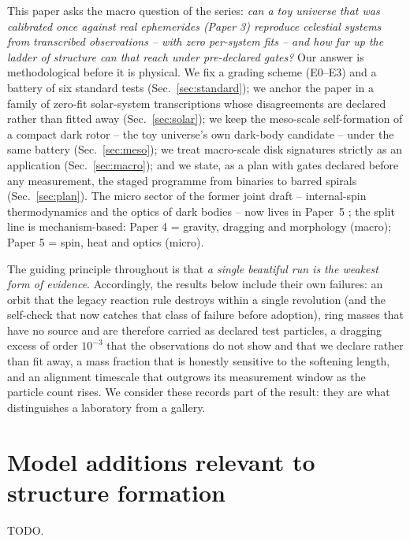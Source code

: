 \documentclass[aps,reprint,amsmath,amssymb,nofootinbib,superscriptaddress,floatfix]{revtex4-2}
\begin{document}
This paper asks the macro question of the series: \emph{can a toy
universe that was calibrated once against real ephemerides (Paper 3)
reproduce celestial systems from transcribed observations -- with zero
per-system fits -- and how far up the ladder of structure can that reach
under pre-declared gates?} Our answer is methodological before it is
physical. We fix a grading scheme (E0--E3) and a battery of six standard
tests (Sec.~\ref{sec:standard}); we anchor the paper in a family of
zero-fit solar-system transcriptions whose disagreements are declared
rather than fitted away (Sec.~\ref{sec:solar}); we keep the meso-scale
self-formation of a compact dark rotor -- the toy universe's own
dark-body candidate -- under the same battery (Sec.~\ref{sec:meso}); we
treat macro-scale disk signatures strictly as an application
(Sec.~\ref{sec:macro}); and we state, as a plan with gates declared
before any measurement, the staged programme from binaries to barred
spirals (Sec.~\ref{sec:plan}). The micro sector of the former joint
draft -- internal-spin thermodynamics and the optics of dark bodies --
now lives in Paper~5 \cite{paper5}; the split line is mechanism-based:
Paper 4 = gravity, dragging and morphology (macro); Paper 5 = spin, heat
and optics (micro).

The guiding principle throughout is that \emph{a single beautiful run is
the weakest form of evidence}. Accordingly, the results below include
their own failures: an orbit that the legacy reaction rule destroys
within a single revolution (and the self-check that now catches that
class of failure before adoption), ring masses that have no source and
are therefore carried as declared test particles, a dragging excess of
order $10^{-3}$ that the observations do not show and that we declare
rather than fit away, a mass fraction that is honestly sensitive to the
softening length, and an alignment timescale that outgrows its
measurement window as the particle count rises. We consider these
records part of the result: they are what distinguishes a laboratory
from a gallery.

\section{Model additions relevant to structure formation}
TODO.
\end{document}
